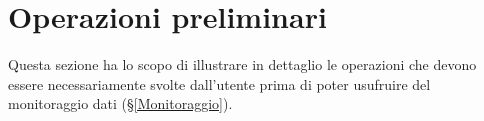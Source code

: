 \section{Operazioni preliminari}\label{PreMonitoraggio}
Questa sezione ha lo scopo di illustrare in dettaglio le operazioni che devono essere necessariamente svolte dall'utente prima di poter usufruire del monitoraggio dati (§\ref{Monitoraggio}).



\pagebreak



\pagebreak

